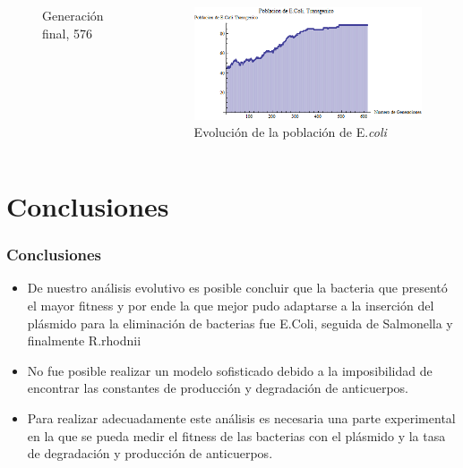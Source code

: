 \documentclass{beamer}
\begin{document}
\begin{frame}
\begin{columns}[c]
\begin{figure}[ht!]
\caption{Generación final, 576}
\end{figure} 
\begin{figure}[ht!]
\vspace*{-1cm}
\includegraphics[scale=0.2]{poblacion_ecoli_trans.png} 
\caption{Evolución de la población de E.\textit{coli}}
\end{figure} 
\end{columns}
\end{frame}


\section{Conclusiones}



\begin{frame}
\frametitle{Conclusiones}
\begin{itemize}
\item De nuestro análisis evolutivo es posible concluir que la bacteria que presentó el mayor fitness y por ende la que mejor pudo adaptarse a la inserción del plásmido para la eliminación de bacterias fue E.Coli, seguida de Salmonella y finalmente R.rhodnii
\item No fue posible realizar un modelo sofisticado debido a la imposibilidad de encontrar las constantes de producción y degradación de anticuerpos.
\item Para realizar adecuadamente este análisis es necesaria una parte experimental en la que se pueda medir el fitness de las bacterias con el plásmido y la tasa de degradación y producción de anticuerpos.
\end{itemize}


\end{frame}

\end{document}
